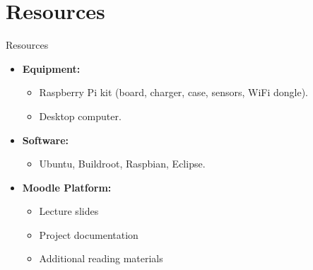 \section{Resources}
\begin{frame}{Resources}
  \begin{itemize}
    \item \textbf{Equipment:}
    \begin{itemize}
      \item Raspberry Pi kit (board, charger, case, sensors, WiFi dongle).
      \item Desktop computer.
    \end{itemize}
    \item \textbf{Software:}
    \begin{itemize}
      \item Ubuntu, Buildroot, Raspbian, Eclipse.
    \end{itemize}
    \item \textbf{Moodle Platform:}
    \begin{itemize}
      \item Lecture slides
      \item Project documentation
      \item Additional reading materials
    \end{itemize}
  \end{itemize}
\end{frame}

